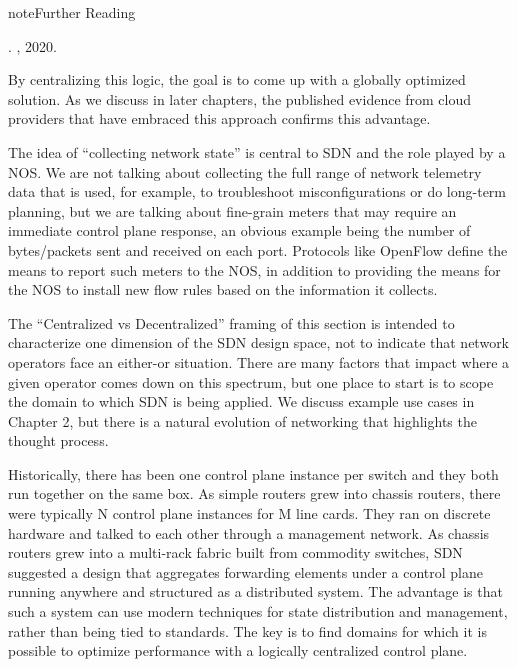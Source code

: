 \documentclass[letterpaper,11pt,english]{sphinxmanual}
\begin{document}
\label{\detokenize{intro:reading-routing}}
\begin{sphinxadmonition}{note}{Further Reading}

. , 2020.
\end{sphinxadmonition}

By centralizing this logic, the goal is to come up with a globally
optimized solution. As we discuss in later chapters, the published
evidence from cloud providers that have embraced this approach
confirms this advantage.

The idea of “collecting network state” is central to SDN and the role
played by a NOS. We are not talking about collecting the full range of
network telemetry data that is used, for example, to troubleshoot
misconfigurations or do long-term planning, but we are talking about
fine-grain meters that may require an immediate control plane
response, an obvious example being the number of bytes/packets sent
and received on each port. Protocols like OpenFlow define the means to
report such meters to the NOS, in addition to providing the means for
the NOS to install new flow rules based on the information it
collects.

\begin{sphinxShadowBox}

The “Centralized vs Decentralized” framing of this section is
intended to characterize one dimension of the SDN design
space, not to indicate that network operators face an
either-or situation. There are many factors that impact where
a given operator comes down on this spectrum, but one place to
start is to scope the domain to which SDN is being applied. We
discuss example use cases in Chapter 2, but there is a natural
evolution of networking that highlights the thought process.

Historically, there has been one control plane instance per
switch and they both run together on the same box. As simple
routers grew into chassis routers, there were typically N
control plane instances for M line cards. They ran on discrete
hardware and talked to each other through a management
network. As chassis routers grew into a multi-rack fabric
built from commodity switches, SDN suggested a design that
aggregates forwarding elements under a control plane running
anywhere and structured as a distributed system. The advantage
is that such a system can use modern techniques for state
distribution and management, rather than being tied to
standards. The key is to find domains for which it is possible
to optimize performance with a logically centralized control
plane.
\end{sphinxShadowBox}
\end{document}
